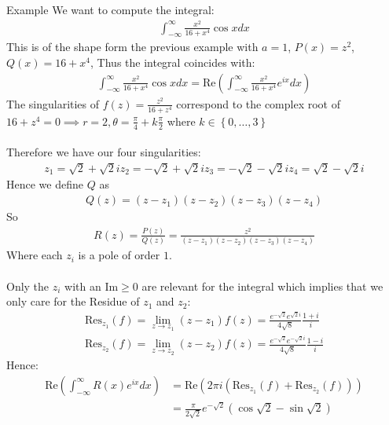 \begin{parag}{Example}
    We want to compute the integral:
	\begin{align*} 
		\int_{-\infty}^{\infty}\frac{x^2}{16 + x^{4}}\cos x dx
	\end{align*}
	This is of the shape form the previous example with $a= 1$, $P\left(x\right)= z^2$, $Q\left(x\right) = 16 + x^{4}$, Thus the integral coincides with:
	\begin{align*} 
		\int_{-\infty}^{\infty}\frac{x^2}{16 + x^{4}} \cos x dx = \text{Re} \left(\int_{-\infty}^{\infty}\frac{x^2}{16 + x^{4}}e^{ix}dx\right)
	\end{align*}
	The singularities of $f\left(z\right) = \frac{z^2}{16 + z^{4}}$ correspond to the complex root of $16 + z^{4} = 0 \implies r = 2, \theta =  \frac{\pi}{4} + k \frac{\pi}{2}$ where $k \in \left\{0, \ldots, 3\right\}$\\
	$ $\\
	Therefore we have our four singularities: 
	\begin{align*} 
		z_1 = \sqrt{2} + \sqrt{2}i
		z_2 = -\sqrt{2} + \sqrt{2}i
		z_3 =- \sqrt{2} - \sqrt{2}i
		z_4 = \sqrt{2} - \sqrt{2}i
	\end{align*}
	Hence we define $Q$ as 
	\begin{align*} 
		Q\left(z\right) =  \left(z - z_1\right)\left(z - z_2\right)\left(z - z_3\right)\left(z - z_4\right)
	\end{align*}
	So 
	\begin{align*} 
		R\left(z\right) = \frac{P\left(z\right)}{Q\left(z\right)} = \frac{z^2}{\left(z - z_1\right)\left(z - z_2\right)\left(z - z_3\right)\left(z - z_4\right)}
	\end{align*}
	Where each $z_i$ is a pole of order $1$.\\
	$ $\\
	Only the $z_i$ with an $\text{Im} \geq 0$ are relevant for the integral which implies that we only care for the Residue of $z_1$ and $z_2$:
	\begin{align*} 
		\text{Res}_{z_1}\left(f\right) =  \lim_{z \to z_1} \left(z-  z_1\right)f\left(z\right) =  \frac{e^{-\sqrt{2}}e^{\sqrt{2}i}}{4\sqrt{8}}\frac{1 + i}{i}\\
		\text{Res}_{z_2}\left(f\right) =  \lim_{z \to z_2} \left(z - z_2\right)f\left(z\right) = \frac{e^{-\sqrt{2}}e^{-\sqrt{2}i}}{4\sqrt{8}}\frac{1 - i}{i}
	\end{align*}
	Hence:
	\begin{align*} 
		\text{Re}\left(\int_{-\infty}^{\infty}R\left(x\right)e^{ix}dx\right) &=  \text{Re}\left(2\pi i \left(\text{Res}_{z_1}\left(f\right) + \text{Res}_{z_2}\left(f\right)\right)\right)\\
																			 &= \frac{\pi}{2\sqrt{2}} e ^{-\sqrt{2}}\left(\cos \sqrt{2} - \sin \sqrt{2}\right)
	\end{align*}
\end{parag}


